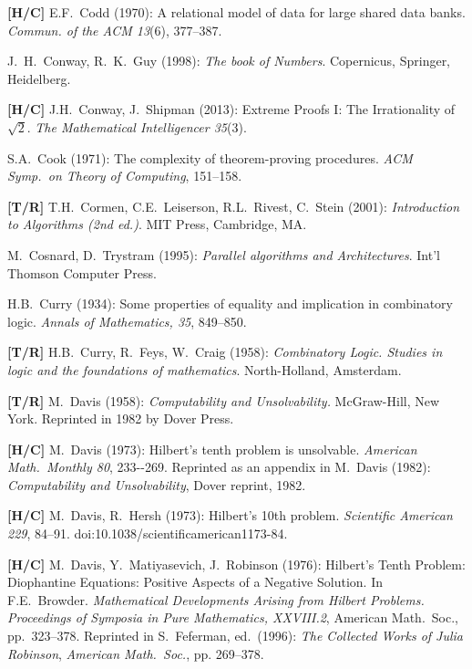 \begin{thebibliography}{999}
{\bf [H/C]}
E.F.~Codd (1970):
A relational model of data for large shared data banks.
{\it Commun. of the ACM 13}(6), 377--387.

J.~H.~Conway, R.~K.~Guy (1998):
{\it The book of Numbers}.
Copernicus, Springer, Heidelberg.

{\bf [H/C]}
J.H.~Conway, J.~Shipman (2013):
Extreme Proofs I: The Irrationality of $\sqrt{2}$.
{\it The Mathematical Intelligencer 35}(3).

S.A.~Cook (1971): The complexity of theorem-proving procedures.  {\it ACM Symp.~on Theory of Computing}, 151--158.

{\bf [T/R]}
T.H.~Cormen, C.E.~Leiserson, R.L.~Rivest, C.~Stein (2001):
{\it Introduction to Algorithms (2nd ed.)}.
MIT Press, Cambridge, MA.

M.~Cosnard, D.~Trystram (1995):
{\it Parallel algorithms and Architectures}.
Int'l Thomson Computer Press.

H.B.~Curry (1934): Some properties of equality and implication in combinatory logic.  {\it Annals of Mathematics, 35}, 849--850.

{\bf [T/R]}
H.B.~Curry, R.~Feys, W.~Craig (1958): {\it Combinatory Logic.  Studies in logic and the foundations of mathematics}.  North-Holland, Amsterdam.


{\bf [T/R]}
M.~Davis (1958): {\it Computability and Unsolvability.}
McGraw-Hill, New York.  Reprinted in 1982 by Dover Press.

{\bf [H/C]}
M.~Davis (1973):
Hilbert's tenth problem is unsolvable.
{\it American Math.~Monthly 80}, 233--269.  Reprinted as an appendix
in M.~Davis (1982): {\it Computability and Unsolvability}, Dover reprint, 1982.

{\bf [H/C]}
M.~Davis, R.~Hersh (1973): Hilbert's 10th problem.  {\it Scientific American 229},
84--91.  doi:10.1038/scientificamerican1173-84.

{\bf [H/C]}
M.~Davis, Y.~Matiyasevich, J.~Robinson (1976): Hilbert's Tenth Problem: Diophantine Equations: Positive Aspects of a Negative Solution.  In F.E.~Browder.  {\it Mathematical Developments Arising from Hilbert Problems.}  {\it Proceedings of Symposia in Pure Mathematics, XXVIII.2}, American Math.~Soc., pp.~323--378.  Reprinted in S.~Feferman, ed.~(1996): {\it The Collected Works of Julia Robinson}, {\it American Math.~Soc.}, pp. 269--378.


\end{thebibliography}
